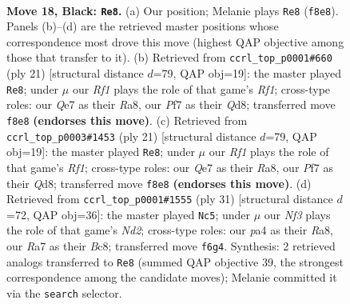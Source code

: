 \documentclass[11pt]{article}
\begin{document}
\clearpage

\begin{figure}[p]\centering
\begin{subfigure}{0.46\textwidth}\centering
\resizebox{\linewidth}{!}{%
\newchessgame
\chessboard[
  setfen={2b2rk1/r3qpp1/np1p1n2/4p2p/P3P3/2NB1N2/2PQ1PPP/R1R3K1 b - - 1 18},
  showmover=false,
  pgfstyle=straightmove, color=movearrow, markmove={f8-e8}
]}
\caption{}
\end{subfigure}\hfill
\begin{subfigure}{0.46\textwidth}\centering
\resizebox{\linewidth}{!}{%
\newchessgame
\chessboard[
  setfen={r2q1rk1/ppp2pbp/n2p1np1/8/2PNP3/2N1B3/PP2QPPP/R3R1K1 b - - 0 11},
  showmover=false,
  pgfstyle=straightmove, color=movearrow, markmove={f8-e8}
]}
\caption{}
\end{subfigure}
\\[4pt]
\begin{subfigure}{0.46\textwidth}\centering
\resizebox{\linewidth}{!}{%
\newchessgame
\chessboard[
  setfen={r2q1rk1/ppp2pbp/n2p1np1/8/2PNP3/2N1B3/PP2QPPP/R3R1K1 b - - 0 11},
  showmover=false,
  pgfstyle=straightmove, color=movearrow, markmove={f8-e8}
]}
\caption{}
\end{subfigure}\hfill
\begin{subfigure}{0.46\textwidth}\centering
\resizebox{\linewidth}{!}{%
\newchessgame
\chessboard[
  setfen={r1bq1rk1/3nnpp1/pp2p2p/4P3/P1Np4/5N2/1P3PPP/R1Q1RBK1 b - - 1 16},
  showmover=false,
  pgfstyle=straightmove, color=movearrow, markmove={d7-c5}
]}
\caption{}
\end{subfigure}
\caption{\textbf{Move 18, Black: \texttt{Re8}.} (a) Our position; Melanie plays \texttt{Re8} (\texttt{f8e8}). Panels (b)--(d) are the retrieved master positions whose correspondence most drove this move (highest QAP objective among those that transfer to it). (b) Retrieved from \texttt{ccrl\_top\_p0001\#660} (ply 21) [structural distance $d$=79, QAP obj=19]: the master played \texttt{Re8}; under $\mu$ our \emph{Rf1} plays the role of that game's \emph{Rf1}; cross-type roles: our \emph{Q}e7 as their \emph{R}a8, our \emph{P}f7 as their \emph{Q}d8; transferred move \texttt{f8e8} \textbf{(endorses this move)}. (c) Retrieved from \texttt{ccrl\_top\_p0003\#1453} (ply 21) [structural distance $d$=79, QAP obj=19]: the master played \texttt{Re8}; under $\mu$ our \emph{Rf1} plays the role of that game's \emph{Rf1}; cross-type roles: our \emph{Q}e7 as their \emph{R}a8, our \emph{P}f7 as their \emph{Q}d8; transferred move \texttt{f8e8} \textbf{(endorses this move)}. (d) Retrieved from \texttt{ccrl\_top\_p0001\#1555} (ply 31) [structural distance $d$=72, QAP obj=36]: the master played \texttt{Nc5}; under $\mu$ our \emph{Nf3} plays the role of that game's \emph{Nd2}; cross-type roles: our \emph{p}a4 as their \emph{R}a8, our \emph{R}a7 as their \emph{B}c8; transferred move \texttt{f6g4}. Synthesis: 2 retrieved analogs transferred to \texttt{Re8} (summed QAP objective 39, the strongest correspondence among the candidate moves); Melanie committed it via the \texttt{search} selector.}
\label{fig:thought-m35}
\end{figure}
\end{document}
